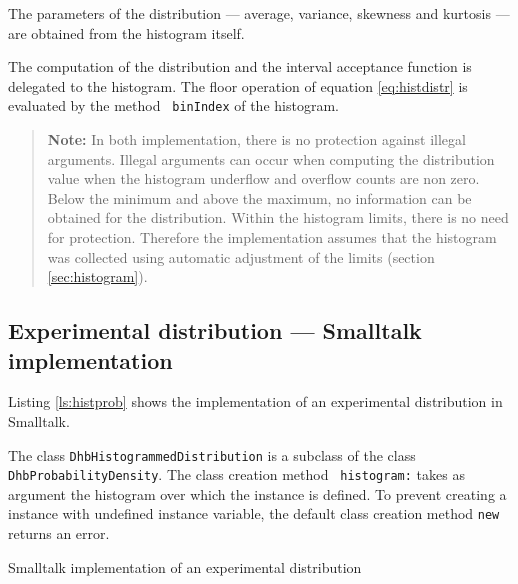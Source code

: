 \documentclass[twoside]{book}
\begin{document}
The parameters of the distribution --- average, variance, skewness
and kurtosis --- are obtained from the histogram itself.

The computation of the distribution and the interval acceptance
function is delegated to the histogram. The floor operation of
equation \ref{eq:histdistr} is evaluated by the method {\tt
binIndex} of the histogram.

\begin{quote}
{\bf Note:} In both implementation, there is no protection against
illegal arguments. Illegal arguments can occur when computing the
distribution value when the histogram underflow and overflow
counts are non zero. Below the minimum and above the maximum, no
information can be obtained for the distribution. Within the
histogram limits, there is no need for protection. Therefore the
implementation assumes that the histogram was collected using
automatic adjustment of the limits (\cf section
\ref{sec:histogram}).
\end{quote}

\subsection{Experimental distribution --- Smalltalk  implementation}
Listing \ref{ls:histprob} shows the implementation of an
experimental distribution in Smalltalk.

The class {\tt DhbHistogrammedDistribution} is a subclass of the
class {\tt DhbProbabilityDensity}. The class creation method {\tt
histogram:} takes as argument the histogram over which the
instance is defined. To prevent creating a instance with undefined
instance variable, the default class creation method {\tt new}
returns an error.

\begin{listing} Smalltalk implementation of an experimental distribution \label{ls:histprob}

\end{listing}




\ifx\wholebook\relax\else
\end{document}
